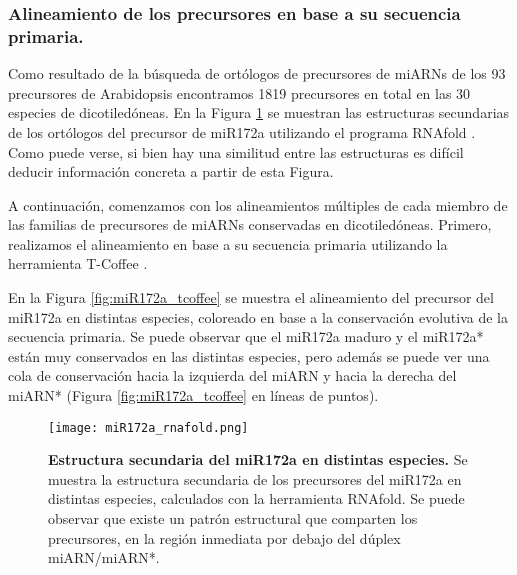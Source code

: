 \subsubsection{Alineamiento de los precursores en base a su secuencia primaria.}

Como resultado de la búsqueda de ortólogos de precursores de miARNs de los 93 precursores de Arabidopsis encontramos 1819 precursores en total en las 30 especies de dicotiledóneas.
En la Figura \ref{fig:miR172a_rnafold} se muestran las estructuras secundarias de los ortólogos del precursor de miR172a utilizando el programa RNAfold \citep{pmid22115189}.
Como puede verse, si bien hay una similitud entre las estructuras es difícil deducir información concreta a partir de esta Figura.

A continuación, comenzamos con los alineamientos múltiples de cada miembro de las familias de precursores de miARNs conservadas en dicotiledóneas.
Primero, realizamos el alineamiento en base a su secuencia primaria utilizando la herramienta T-Coffee \citep{pmid10964570}.

En la Figura \ref{fig:miR172a_tcoffee} se muestra el alineamiento del precursor del miR172a en distintas especies, coloreado en base a la conservación evolutiva de la secuencia primaria.
Se puede observar que el miR172a maduro y el miR172a* están muy conservados en las distintas especies, pero además se puede ver una cola de conservación hacia la izquierda del miARN y hacia la derecha del miARN* (Figura \ref{fig:miR172a_tcoffee} en líneas de puntos).


\begin{landscape}
    \begin{figure}[htbp!] 
        \centering    
        \texttt{[image: miR172a\_rnafold.png]}
        \caption[Estructura secundaria del miR172a en distintas especies]{
        \textbf{Estructura secundaria del miR172a en distintas especies.}
        Se muestra la estructura secundaria de los precursores del miR172a en distintas especies, calculados con la herramienta RNAfold.
        Se puede observar que existe un patrón estructural que comparten los precursores, en la región inmediata por debajo del dúplex miARN/miARN*.
        }
        \label{fig:miR172a_rnafold}
    \end{figure}
\end{landscape}

